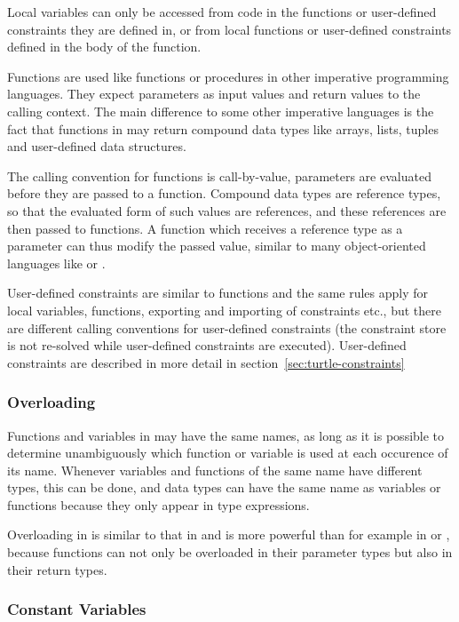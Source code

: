 Local variables can only be accessed from code in the functions or
user-defined constraints they are defined in, or from local functions
or user-defined constraints defined in the body of the function.

%
Functions are used like functions or procedures in other imperative
programming languages.  They expect parameters as input values and
return values to the calling context.  The main difference to some
other imperative languages is the fact that functions in \turtle{} may
return compound data types like arrays, lists, tuples and user-defined
data structures.

The calling convention for functions is call-by-value, parameters are
evaluated before they are passed to a function.  Compound data types
are reference types, so that the evaluated form of such values are
references, and these references are then passed to functions.  A
function which receives a reference type as a parameter can thus
modify the passed value, similar to many object-oriented languages
like \java{}
or \smalltalk{}%
.

User-defined constraints are similar to functions and the same rules
apply for local variables, functions, exporting and importing of
constraints etc., but there are different calling conventions for
user-defined constraints (the constraint store is not re-solved while
user-defined constraints are executed).  User-defined constraints are
described in more detail in section~\ref{sec:turtle-constraints}

\subsubsection{Overloading}

Functions and variables in \turtle{} may have the same names, as long
as it is possible to determine unambiguously which function or
variable is used at each occurence of its name.  Whenever variables
and functions of the same name have different types, this can be done,
and data types can have the same name as variables or functions
because they only appear in type expressions.

Overloading in \turtle{} is similar to that in \ada{}
and is more powerful than for example in \java{} or \cplusplus{},
because functions can not only be overloaded in their parameter types
but also in their return types.

\subsubsection{Constant Variables}

